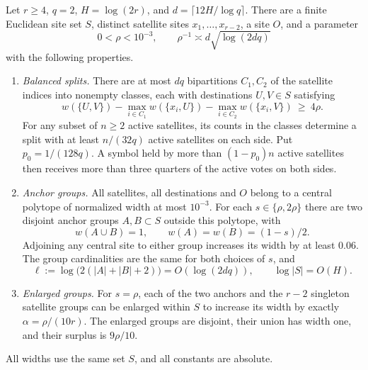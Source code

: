 \begin{lemma}\label{lem:layout}
Let \(r\ge4\), \(q=2\), \(H=\log(2r)\), and
\(d=\lceil12H/\log q\rceil\). There are a finite Euclidean site set
\(S\), distinct satellite sites \(x_1,\ldots,x_{r-2}\), a site \(O\),
and a parameter
\[
        0<\rho<10^{-3},\qquad
        \rho^{-1}\asymp d\sqrt{\log(2dq)}
\]
with the following properties.
\begin{enumerate}
\item \emph{Balanced splits.} There are at most \(dq\) bipartitions
\(C_1,C_2\) of the satellite indices into nonempty classes, each with
destinations \(U,V\in S\) satisfying
\begin{equation}\label{eq:split-gap}
 w(\{U,V\})-
 \max_{i\in C_1}w(\{x_i,U\})-
 \max_{i\in C_2}w(\{x_i,V\})\ \ge\ 4\rho .
\end{equation}
For any subset of \(n\ge2\) active satellites, its counts in the
classes determine a split with at least \(n/(32q)\) active satellites
on each side. Put \(p_0=1/(128q)\). A symbol held by more than
\((1-p_0)n\) active satellites then receives more than three quarters
of the active votes on both sides.
\item \emph{Anchor groups.} All satellites, all destinations and \(O\)
belong to a central polytope of normalized width at most \(10^{-3}\).
For each \(s\in\{\rho,2\rho\}\) there are two disjoint anchor groups
\(A,B\subset S\) outside this polytope, with
\[
         w(A\cup B)=1,\qquad w(A)=w(B)=(1-s)/2 .
\]
Adjoining any central site to either group increases its width by at
least \(0.06\). The group cardinalities are the same for both choices
of \(s\), and
\[
  \ell:=\log\bigl(2(|A|+|B|+2)\bigr)=O(\log(2dq)),
  \qquad \log|S|=O(H).
\]
\item \emph{Enlarged groups.} For \(s=\rho\), each of the two anchors
and the \(r-2\) singleton satellite groups can be enlarged within \(S\)
to increase its width by exactly \(\alpha=\rho/(10r)\). The enlarged
groups are disjoint, their union has width one, and their surplus is
\(9\rho/10\).
\end{enumerate}
All widths use the same set \(S\), and all constants are absolute.
\end{lemma}

